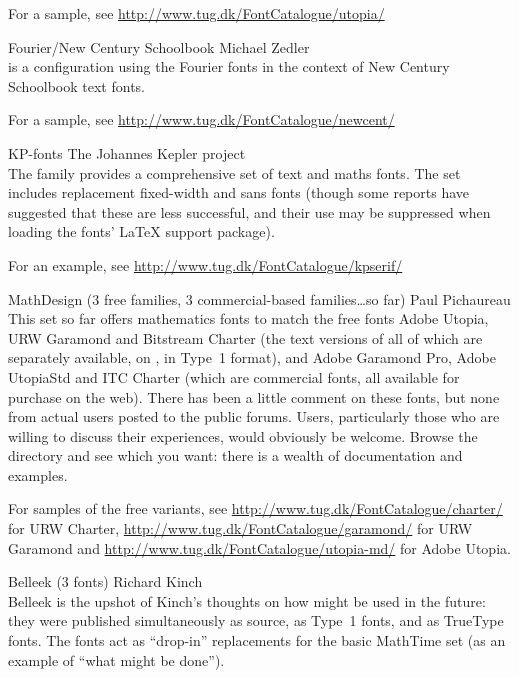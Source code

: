 \begin{booklist}
  For a sample, see \url{http://www.tug.dk/FontCatalogue/utopia/}

\item[Fourier/New Century Schoolbook]Michael Zedler\\
   is a configuration using the Fourier fonts in
  the context of New Century Schoolbook text fonts.

  For a sample, see \url{http://www.tug.dk/FontCatalogue/newcent/}

\item[KP-fonts]The Johannes Kepler project\\
  The  family provides a comprehensive set of text
  and maths fonts.  The set includes replacement fixed-width and sans
  fonts (though some reports have suggested that these are less
  successful, and their use may be suppressed when loading the fonts'
   \LaTeX{} support package).

  For an example, see \url{http://www.tug.dk/FontCatalogue/kpserif/}

\item[MathDesign](3 free families, 3 commercial-based
  families\dots{}so far) Paul Pichaureau\\
  This set so far offers mathematics fonts to match the free fonts
  Adobe Utopia, URW Garamond and Bitstream Charter (the text versions
  of all of which are separately available, on , in Type~1
  format), and Adobe Garamond Pro, Adobe UtopiaStd and ITC Charter
  (which are commercial fonts, all available for purchase on the web).
  There has been a little comment on these fonts, but none
  from actual users posted to the public forums.  Users, particularly
  those who are willing to discuss their experiences, would obviously
  be welcome.  Browse the  directory and see which you
  want: there is a wealth of documentation and examples.

  For samples of the free variants, see
  \url{http://www.tug.dk/FontCatalogue/charter/} for URW Charter,
  \url{http://www.tug.dk/FontCatalogue/garamond/} for URW Garamond and
  \url{http://www.tug.dk/FontCatalogue/utopia-md/} for Adobe Utopia.

\item[Belleek](3 fonts) Richard Kinch\\
  Belleek is the upshot of Kinch's thoughts on how \MF{} might be used
  in the future: they were published simultaneously as \MF{} source,
  as Type~1 fonts, and as TrueType fonts.  The fonts act as ``drop-in''
  replacements for the basic MathTime set (as an example of ``what might
  be done'').


\end{booklist}
